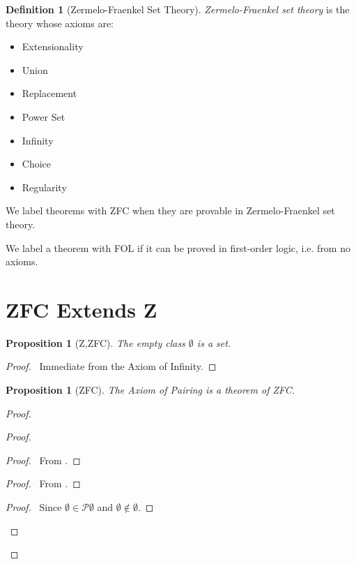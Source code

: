 \documentclass{book}
\let\qed\relax
\newtheorem{prop}[ax]{Proposition}
\theoremstyle{definition}
\newtheorem{df}[ax]{Definition}
\begin{document}
\begin{df}[Zermelo-Fraenkel Set Theory]
\emph{Zermelo-Fraenkel set theory} is the theory whose axioms are:
\begin{itemize}
\item Extensionality
\item Union
\item Replacement
\item Power Set
\item Infinity
\item Choice
\item Regularity
\end{itemize}
We label theorems with ZFC when they are provable in Zermelo-Fraenkel set theory.
\end{df}

We label a theorem with FOL if it can be proved in first-order logic, i.e. from no axioms.

\section{ZFC Extends Z}

\begin{prop}[Z,ZFC]
The empty class $\emptyset$ is a set.
\end{prop}

\begin{proof}
\pf\ Immediate from the Axiom of Infinity. \qed
\end{proof}

\begin{prop}[ZFC]
The Axiom of Pairing is a theorem of ZFC.
\end{prop}

\begin{proof}
\pf
{}
\begin{proof}
	\begin{proof}
		\pf\ From .
	\end{proof}
	\begin{proof}
		\pf\ From .
	\end{proof}
	\begin{proof}
		\pf\ Since $\emptyset \in \mathcal{P} \emptyset$ and $\emptyset \notin \emptyset$.
	\end{proof}
\end{proof}
\qed
\end{proof}
\end{document}
